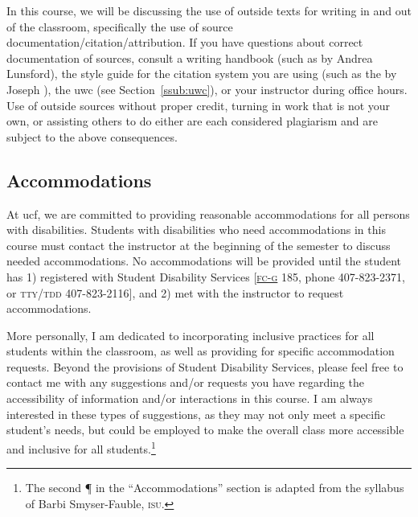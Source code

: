 \documentclass[11pt,oneside]{amsart}	%
\begin{document}
In this course, we will be discussing the use of outside texts for writing in and out of the classroom, specifically the use of source documentation/citation/attribution. If you have questions about correct documentation of sources, consult a writing handbook (such as  by Andrea Lunsford), the style guide for the citation system you are using (such as the  by Joseph \citeauthor{gibaldi:2009aa}), the \ac{uwc} (see Section~\ref{ssub:uwc}), or your instructor during office hours. Use of outside sources without proper credit, turning in work that is not your own, or assisting others to do either are each considered plagiarism and are subject to the above consequences.

\subsection{Accommodations}
At \ac{ucf}, we are committed to providing reasonable accommodations for all persons with disabilities. Students with disabilities who need accommodations in this course must contact the instructor at the beginning of the semester to discuss needed accommodations. No accommodations will be provided until the student has 1) registered with Student Disability Services [\href{http://map.ucf.edu/locations/7g/ferrell-commons-g-fc-g/}{\textsc{fc-g}} 185, phone 407-823-2371, or \textsc{tty/tdd} 407-823-2116], and 2) met with the instructor to request accommodations.

More personally, I am dedicated to incorporating inclusive practices for all students within the classroom, as well as providing for specific accommodation requests. Beyond the provisions of Student Disability Services, please feel free to contact me with any suggestions and/or requests you have regarding the accessibility of information and/or interactions in this course. I am always interested in these types of suggestions, as they may not only meet a specific student's needs, but could be employed to make the overall class more accessible and inclusive for all students.\footnote{The second ¶ in the ``Accommodations'' section is adapted from the syllabus of Barbi Smyser-Fauble, \textsc{isu}.}
\end{document}
